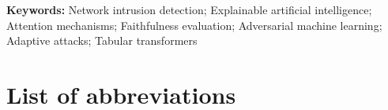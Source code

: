 \documentclass[11pt]{article}
\title{\paperTitle}
\author{}
\date{}
\begin{document}
\maketitle


\noindent\textbf{Keywords:} Network intrusion detection; Explainable artificial intelligence; Attention mechanisms;
Faithfulness evaluation; Adversarial machine learning; Adaptive attacks; Tabular transformers










\FloatBarrier

\section*{List of abbreviations}
\end{document}
